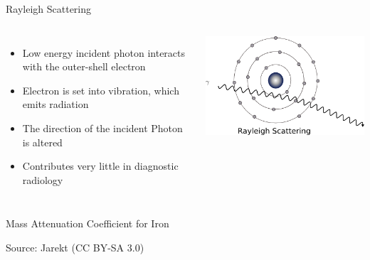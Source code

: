 \begin{frame}[c]{Rayleigh Scattering}
    \begin{columns}[c]
        \begin{itemize}
            \setlength\itemsep{0.2cm}
            \item Low energy incident photon interacts with the outer-shell electron
            \item Electron is set into vibration, which emits radiation
            \item The direction of the incident Photon is altered
            \item Contributes very little in diagnostic radiology
        \end{itemize}
        \includegraphics[height=0.5\textheight]{images/rayleigh}\\[-0.5\baselineskip]
    \end{columns}
\end{frame}




\begin{frame}[c]{Mass Attenuation Coefficient for Iron}
    \begin{figure}[c]
        \centering
        \tiny	{}
        

    \end{figure}
    \vspace{-1cm}
    \begin{flushright}
        \tiny Source: Jarekt (CC BY-SA 3.0)
    \end{flushright}
\end{frame}

